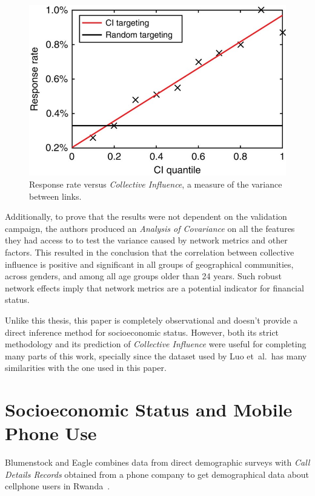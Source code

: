 \begin{figure}
\centering
\includegraphics[height=.25\textheight]{figures/luo2017results.png}
\caption{Response rate versus \emph{Collective Influence}, a measure of the variance between links.}
\label{fig:luo2017results}
\end{figure}

Additionally, to prove that the results were not dependent on the validation campaign, the authors produced an \emph{Analysis of Covariance}\cite{wildt1978analysis} on all the features they had access to to test the variance caused by network metrics and other factors.
This resulted in the conclusion that the correlation between collective influence is positive and significant in all groups of geographical communities, across genders, and among all age groups older than 24 years.
Such robust network effects imply that network metrics are a potential indicator for financial status.

Unlike this thesis, this paper is completely observational and doesn't provide a direct inference method for socioeconomic status. However, both its strict methodology and its prediction of \emph{Collective Influence} were useful for completing many parts of this work, specially since the dataset used by Luo et~al.\ has many similarities with the one used in this paper.


\section{Socioeconomic Status and Mobile Phone Use}

Blumenstock and Eagle combines data from direct demographic surveys with \emph{Call Details Records} obtained from a phone company to get demographical data about cellphone users in Rwanda~\cite{blumenstock2010mobile}.

